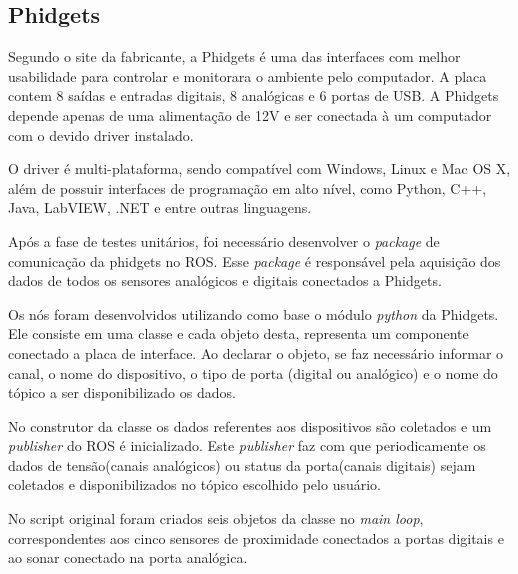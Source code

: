 		\pagebreak
		
		


\subsection{Phidgets}


	Segundo o site da fabricante, a Phidgets é uma das interfaces com melhor usabilidade para controlar e monitorara o ambiente pelo computador. A placa contem 8 saídas e entradas digitais, 8 analógicas e 6 portas de USB. A Phidgets depende apenas de uma alimentação de 12V e ser conectada à um computador com o devido driver instalado. 
	
	O driver é multi-plataforma, sendo compatível com Windows, Linux e Mac OS X, além de possuir interfaces de programação em alto nível, como Python, C++, Java, LabVIEW, .NET e entre outras linguagens.

     Após a fase de testes unitários, foi necessário desenvolver o \textit{package} de comunicação da phidgets no ROS. Esse \textit{package} é responsável pela aquisição dos dados de todos os sensores analógicos e digitais conectados a Phidgets.
     
     Os nós foram desenvolvidos utilizando como base o módulo \textit{python} da Phidgets. Ele consiste em uma classe e cada objeto desta, representa um componente conectado a placa de interface. Ao declarar o objeto, se faz necessário informar o canal, o nome do dispositivo, o tipo de porta (digital ou analógico) e o nome do tópico a ser disponibilizado os dados. 
     
     No construtor da classe os dados referentes aos dispositivos são coletados e um \textit{publisher} do ROS é inicializado. Este  \textit{publisher} faz com que periodicamente os dados de tensão(canais analógicos) ou status da porta(canais digitais) sejam coletados e disponibilizados no tópico escolhido pelo usuário. 
     
     No script original foram criados seis objetos da classe no \textit{main loop}, correspondentes aos cinco sensores de proximidade conectados a portas digitais e ao sonar conectado na porta analógica.

